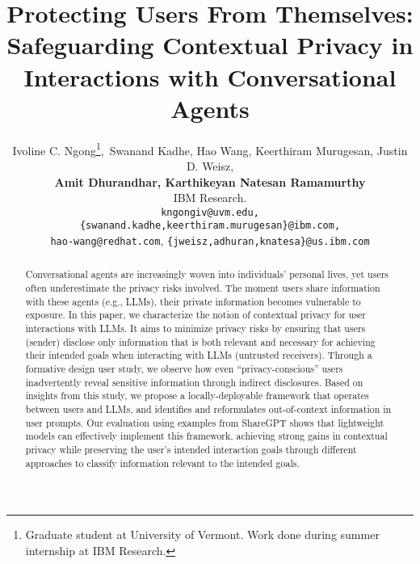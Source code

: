 \documentclass[11pt]{article}
\title{Protecting Users From Themselves:\\ Safeguarding Contextual Privacy in Interactions with Conversational Agents}
\author{Ivoline C. Ngong\thanks{Graduate student at University of Vermont. Work done during summer internship at IBM Research.},~Swanand Kadhe, Hao Wang, Keerthiram Murugesan, Justin D. Weisz,\\ 
\textbf{Amit Dhurandhar, Karthikeyan Natesan Ramamurthy} \\
IBM Research. \\
\texttt{kngongiv@uvm.edu,}\\
\texttt{\{swanand.kadhe,keerthiram.murugesan\}@ibm.com,}\\
\texttt{hao-wang@redhat.com},
\texttt{\{jweisz,adhuran,knatesa\}@us.ibm.com}
}
\begin{document}
\maketitle
\begin{abstract}
Conversational agents are increasingly woven into individuals' personal lives, yet users often underestimate the privacy risks involved. The moment users share information with these agents (e.g., LLMs), their private information becomes vulnerable to exposure. In this paper, we characterize the notion of contextual privacy for user interactions with LLMs. It aims to minimize privacy risks by ensuring that users (sender) disclose only information that is both relevant and necessary for achieving their intended goals when interacting with LLMs (untrusted receivers). Through a formative design user study, we observe how even ``privacy-conscious'' users inadvertently reveal sensitive information through indirect disclosures. 
Based on insights from this study, 
we propose a locally-deployable framework that operates between users and LLMs, and identifies and reformulates out-of-context information in user prompts. Our evaluation using examples from ShareGPT shows that lightweight models can effectively implement this framework, achieving strong gains in contextual privacy while preserving the user's intended interaction goals through different approaches to classify information relevant to the intended goals. 
\end{abstract}











\clearpage


\appendix


\onecolumn



\end{document}
